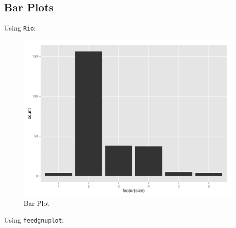 \documentclass[
]{book}
\newenvironment{Shaded}{\begin{snugshade}}{\end{snugshade}}
\newcommand{\ExtensionTok}[1]{#1}
\newcommand{\KeywordTok}[1]{\textcolor[rgb]{0.13,0.29,0.53}{\textbf{#1}}}
\newcommand{\NormalTok}[1]{#1}
\newcommand{\OperatorTok}[1]{\textcolor[rgb]{0.81,0.36,0.00}{\textbf{#1}}}
\newcommand{\StringTok}[1]{\textcolor[rgb]{0.31,0.60,0.02}{#1}}
\theoremstyle{definition}
\theoremstyle{definition}
\theoremstyle{definition}
\theoremstyle{remark}
\begin{document}
\hypertarget{bar-plots}{%
\subsection{Bar Plots}\label{bar-plots}}

Using \texttt{Rio}:

\begin{Shaded}
\end{Shaded}

\begin{figure}

{\centering \includegraphics[width=32.81in]{images/rio-barplot} 

}

\caption{Bar Plot}\label{fig:unnamed-chunk-25}
\end{figure}

Using \texttt{feedgnuplot}:
\end{document}
